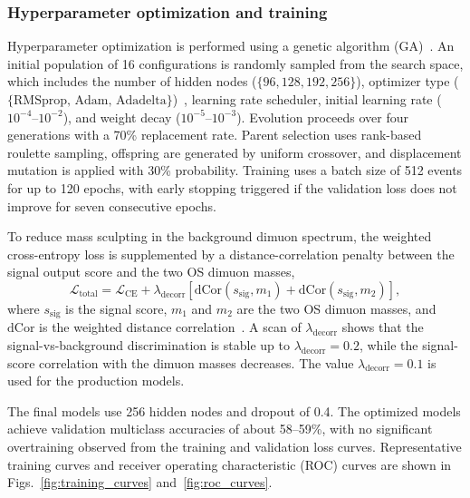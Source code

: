 \subsubsection{Hyperparameter optimization and training}

Hyperparameter optimization is performed using a genetic algorithm (GA)~\cite{GeneticAlgorithm}. An initial population of 16 configurations is randomly sampled from the search space, which includes the number of hidden nodes ($\{96, 128, 192, 256\}$), optimizer type ($\{\text{RMSprop, Adam, Adadelta}\}$)~\cite{optimizers}, learning rate scheduler, initial learning rate ($10^{-4}$--$10^{-2}$), and weight decay ($10^{-5}$--$10^{-3}$). Evolution proceeds over four generations with a 70\% replacement rate. Parent selection uses rank-based roulette sampling, offspring are generated by uniform crossover, and displacement mutation is applied with 30\% probability. Training uses a batch size of 512 events for up to 120 epochs, with early stopping triggered if the validation loss does not improve for seven consecutive epochs.

To reduce mass sculpting in the background dimuon spectrum, the weighted cross-entropy loss is supplemented by a distance-correlation penalty between the signal output score and the two OS dimuon masses,
\begin{equation}
  \mathcal{L}_\mathrm{total}
  = \mathcal{L}_\mathrm{CE}
  + \lambda_\mathrm{decorr}\left[
      \mathrm{dCor}(s_\mathrm{sig}, m_1)
      + \mathrm{dCor}(s_\mathrm{sig}, m_2)
    \right],
  \label{eq:pnet_decorrelation_loss}
\end{equation}
where $s_\mathrm{sig}$ is the signal score, $m_1$ and $m_2$ are the two OS dimuon masses, and $\mathrm{dCor}$ is the weighted distance correlation~\cite{distancecorrelation}. A scan of $\lambda_\mathrm{decorr}$ shows that the signal-vs-background discrimination is stable up to $\lambda_\mathrm{decorr} = 0.2$, while the signal-score correlation with the dimuon masses decreases. The value $\lambda_\mathrm{decorr} = 0.1$ is used for the production models.

The final models use 256 hidden nodes and dropout of 0.4. The optimized models achieve validation multiclass accuracies of about 58--59\%, with no significant overtraining observed from the training and validation loss curves. Representative training curves and receiver operating characteristic (ROC) curves are shown in Figs.~\ref{fig:training_curves} and~\ref{fig:roc_curves}.

